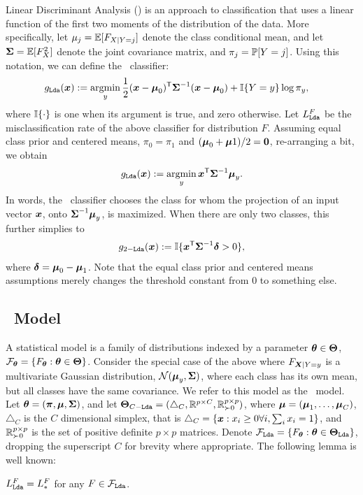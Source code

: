 \documentclass[10pt]{article}
\begin{document}
Linear Discriminant Analysis (\Lda) is an approach to classification that uses a linear function of the first two moments of the distribution of the data.  More specifically, let $\mu_j=\mathbb{E}[F_{X|Y=j}]$ denote the class conditional mean, and let $\boldsymbol{\Sigma}=\mathbb{E}[F_{X}^2]$ denote the joint covariance matrix, and $\pi_j=\mathbb{P}[Y=j]$.   Using this notation, we can define the \Lda~classifier:
\begin{align*}
g_{\Lda}(\bx)&:=\argmin_y \frac{1}{2} (\bx-\bmu_0)\T \bSig^{-1}(\bx-\bmu_0) + \II\{Y=y\}  \log \pi_y,
\end{align*}  
where $\mathbb{I}\{ \cdot\}$ is one when its argument is true, and zero otherwise.
Let $L_{{\sc \texttt{Lda}}}^F$ be the misclassification rate of the above classifier for distribution $F$.
% 
Assuming equal class prior and centered means,  $\pi_0=\pi_1$ and $(\boldsymbol{\mu}_0+\boldsymbol{\mu}1)/2=\boldsymbol{0}$, re-arranging a bit, we obtain
\begin{align*}
g_{\Lda}(\bx) :=  \argmin_y \bx\T \bSig^{-1} \bmu_y.
\end{align*}
In words, the  \Lda~classifier chooses the class for whom the projection of an input vector $\boldsymbol{x}$, onto $\boldsymbol{\Sigma}^{-1} \boldsymbol{\mu}_y$, is maximized.
% 
When there are only two classes, this further simplies to 
\begin{align*}
g_{2-{\sc \texttt{Lda}}}(\boldsymbol{x}) :=  \mathbb{I}\{ \boldsymbol{x}^{\mathsf{T}} \boldsymbol{\Sigma}^{-1} \boldsymbol{\delta} > 0 \},
\end{align*}
where $\boldsymbol{\delta}=\boldsymbol{\mu}_0-\boldsymbol{\mu}_1$.   Note that the equal class prior and centered means assumptions merely changes the threshold constant from $0$ to something else.  

\subsection{\Lda~Model}

A statistical model is  a family of distributions indexed by a parameter $\boldsymbol{\theta} \in \boldsymbol{\Theta}$, $\mathcal{F}_{\boldsymbol{\theta}}=\{F_{\boldsymbol{\theta}} : \boldsymbol{\theta} \in \boldsymbol{\Theta} \}$.  
Consider the special case of the above where $F_{\boldsymbol{X}|Y=y}$ is a multivariate Gaussian distribution, 
$\mathcal{N}(\boldsymbol{\mu}_y,\boldsymbol{\Sigma})$, where each class has its own mean, but all classes have the same covariance. 
We refer to this model as the \Lda~model. 
Let $\boldsymbol{\theta}=(\boldsymbol{\pi},\boldsymbol{\mu},\boldsymbol{\Sigma})$, and let $\boldsymbol{\Theta}_{C-{\sc \texttt{Lda}}}=( \triangle_C, \mathbb{R}^{p \times C},\mathbb{R}_{\succ 0}^{p \times p})$, where $\boldsymbol{\mu}=(\boldsymbol{\mu}_1,\ldots, \boldsymbol{\mu}_C)$, $\triangle_C$ is the $C$ dimensional simplex, that is $\triangle_C = \{ \boldsymbol{x} : x_i \geq 0 \forall i, \sum_i x_i = 1\}$, and $\mathbb{R}_{\succ 0}^{p \times p}$ is the set of positive definite  $p \times p$ matrices. Denote
$\mathcal{F}_{{\sc \texttt{Lda}}}=\{F_{\boldsymbol{\theta}} : \boldsymbol{\theta} \in \boldsymbol{\Theta}_{{\sc \texttt{Lda}}}\}$, dropping the superscript $C$ for brevity where appropriate.
The following lemma is well known:
\begin{lem}
$L_{{\sc \texttt{Lda}}}^F=L_*^F$ for any $F \in \mathcal{F}_{{\sc \texttt{Lda}}}$.
\end{lem}
\end{document}
